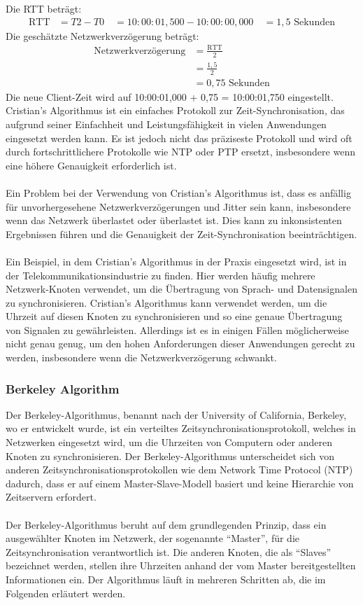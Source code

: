 \documentclass[../vs-script-first-v01.tex]{subfiles}
\begin{document}
Die RTT beträgt:
\begin{align*}
\text{RTT} &= T2 - T0 \
&= 10:00:01,500 - 10:00:00,000 \
&= 1,5\text{ Sekunden}
\end{align*}
Die geschätzte Netzwerkverzögerung beträgt:
\begin{align*}
\text{Netzwerkverzögerung} &= \frac{\text{RTT}}{2} \\
&= \frac{1,5}{2} \\
&= 0,75\text{ Sekunden}
\end{align*}
Die neue Client-Zeit wird auf 10:00:01,000 + 0,75 = 10:00:01,750 eingestellt.
Cristian's Algorithmus ist ein einfaches Protokoll zur Zeit-Synchronisation, das aufgrund seiner Einfachheit und Leistungsfähigkeit in vielen Anwendungen eingesetzt werden kann. Es ist jedoch nicht das präziseste Protokoll und wird oft durch fortschrittlichere Protokolle wie NTP oder PTP ersetzt, insbesondere wenn eine höhere Genauigkeit erforderlich ist.
\\\\
Ein Problem bei der Verwendung von Cristian's Algorithmus ist, dass es anfällig für unvorhergesehene Netzwerkverzögerungen und Jitter sein kann, insbesondere wenn das Netzwerk überlastet oder überlastet ist. Dies kann zu inkonsistenten Ergebnissen führen und die Genauigkeit der Zeit-Synchronisation beeinträchtigen.
\\\\
Ein Beispiel, in dem Cristian's Algorithmus in der Praxis eingesetzt wird, ist in der Telekommunikationsindustrie zu finden. Hier werden häufig mehrere Netzwerk-Knoten verwendet, um die Übertragung von Sprach- und Datensignalen zu synchronisieren. Cristian's Algorithmus kann verwendet werden, um die Uhrzeit auf diesen Knoten zu synchronisieren und so eine genaue Übertragung von Signalen zu gewährleisten. Allerdings ist es in einigen Fällen möglicherweise nicht genau genug, um den hohen Anforderungen dieser Anwendungen gerecht zu werden, insbesondere wenn die Netzwerkverzögerung schwankt.

\subsubsection{Berkeley Algorithm}

Der Berkeley-Algorithmus, benannt nach der University of California, Berkeley, wo er entwickelt wurde, ist ein verteiltes Zeitsynchronisationsprotokoll, welches in Netzwerken eingesetzt wird, um die Uhrzeiten von Computern oder anderen Knoten zu synchronisieren.  Der Berkeley-Algorithmus unterscheidet sich von anderen Zeitsynchronisationsprotokollen wie dem Network Time Protocol (NTP) dadurch, dass er auf einem Master-Slave-Modell basiert und keine Hierarchie von Zeitservern erfordert.
\\\\
Der Berkeley-Algorithmus beruht auf dem grundlegenden Prinzip, dass ein ausgewählter Knoten im Netzwerk, der sogenannte \enquote{Master}, für die Zeitsynchronisation verantwortlich ist. Die anderen Knoten, die als \enquote{Slaves} bezeichnet werden, stellen ihre Uhrzeiten anhand der vom Master bereitgestellten Informationen ein. Der Algorithmus läuft in mehreren Schritten ab, die im Folgenden erläutert werden.
\end{document}

